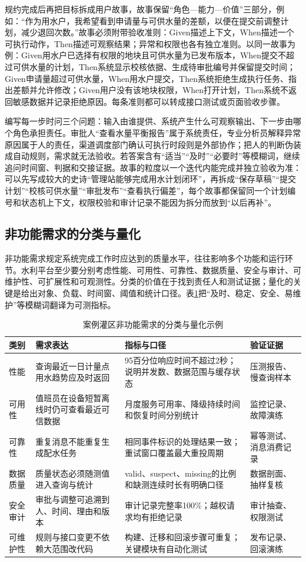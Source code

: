 规约完成后再把目标拆成用户故事，故事保留“角色—能力—价值”三部分，例如：“作为用水户，我希望看到申请量与可供水量的差额，以便在提交前调整计划，减少退回次数。”故事必须附带验收准则：Given描述上下文，When描述一个可执行动作，Then描述可观察结果；异常和权限也各有独立准则。以同一故事为例：Given用水户已选择有权限的地块且可供水量为已发布版本，When提交不超过可供水量的计划，Then系统显示校核依据、生成待审批编号并保留提交时间；Given申请量超过可供水量，When用水户提交，Then系统拒绝生成执行任务、指出差额并允许修改；Given用户没有该地块权限，When打开计划，Then系统不返回敏感数据并记录拒绝原因。每条准则都可以转成接口测试或页面验收步骤。

编写每一步时问三个问题：输入由谁提供、系统产生什么可观察输出、下一步由哪个角色承担责任。审批人“查看水量平衡报告”属于系统责任，专业分析员解释异常原因属于人的责任，渠道调度部门确认可执行时段则是外部协作；把人的判断伪装成自动规则，需求就无法验收。若答案含有“适当”“及时”“必要时”等模糊词，继续追问时间窗、判据和交接证据。故事的粒度以一个迭代内能完成并独立验收为准：可以先写成较大的史诗“管理站能够完成用水计划闭环”，再拆成“保存草稿”“提交计划”“校核可供水量”“审批发布”“查看执行偏差”，每个故事都保留同一个计划编号和状态机上下文，权限校验和审计记录不能因为拆分而放到“以后再补”。

\subsection{非功能需求的分类与量化}

非功能需求规定系统完成工作时应达到的质量水平，往往影响多个功能和运行环节。水利平台至少要分别考虑性能、可用性、可靠性、数据质量、安全与审计、可维护性、可扩展性和可观测性。分类的价值在于找到责任人和测试证据；量化的关键是给出对象、负载、时间窗、阈值和统计口径。表\ref{tab:ch02-nfr-metrics}把“及时、稳定、安全、易维护”等模糊词翻译为可测指标。

\begin{table}[htbp]
\centering
\caption{案例灌区非功能需求的分类与量化示例}
\label{tab:ch02-nfr-metrics}
\begin{tabular}{p{2.4cm}p{3.8cm}p{3.4cm}p{3.2cm}}
\toprule
类别 & 需求表达 & 指标与口径 & 验证证据 \\
\midrule
性能 & 查询最近一日计量点用水趋势应及时返回 & 95百分位响应时间不超过2秒；说明并发数、数据范围与缓存状态 & 压测报告、慢查询样本 \\
可用性 & 值班员在设备短暂离线时仍可查看最近可信数据 & 月度服务可用率、降级持续时间和恢复时间分别统计 & 监控记录、故障演练 \\
可靠性 & 重复消息不能重复生成配水任务 & 相同事件标识的处理结果一致；重试窗口覆盖最大重投周期 & 幂等测试、消息消费记录 \\
数据质量 & 质量状态必须随测值进入查询与统计 & valid、suspect、missing的比例和缺测连续时长有明确口径 & 数据剖面、抽样复核 \\
安全审计 & 审批与调整可追溯到人、时间、理由和版本 & 审计记录完整率100\%；越权请求均有拒绝记录 & 审计抽查、权限测试 \\
可维护性 & 规则与接口变更不依赖大范围改代码 & 构建、迁移和回滚步骤可重复；关键模块有自动化测试 & 发布记录、回滚演练 \\
\bottomrule
\end{tabular}
\end{table}

